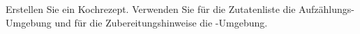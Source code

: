 Erstellen Sie ein Kochrezept. Verwenden Sie für die Zutatenliste die Aufzählungs-Umgebung  und für die Zubereitungshinweise die -Umgebung.